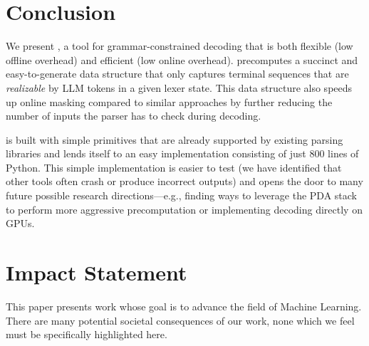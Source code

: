 


\section{Conclusion}
\label{sec:conclusion}

We present \name, a tool for grammar-constrained decoding that is both flexible (low offline overhead) and efficient (low online overhead).
% 
\name precomputes a succinct and easy-to-generate data structure that only captures terminal sequences that are \textit{realizable} by LLM tokens in a given lexer state.
% 
This data structure also speeds up online masking compared to similar approaches by further reducing the number of inputs the parser has to check during decoding. 


\name is built with simple primitives that are already supported by existing parsing libraries and lends itself to an easy implementation consisting of just 800 lines of Python.
% 
This simple implementation is easier to test (we have identified that other tools often crash or produce incorrect outputs) and opens the door to many future possible research directions---e.g., finding ways to leverage the PDA stack to perform more aggressive precomputation or implementing decoding directly on GPUs.


\section*{Impact Statement}

This paper presents work whose goal is to advance the field
of Machine Learning. There are many potential societal
consequences of our work, none which we feel must be
specifically highlighted here.